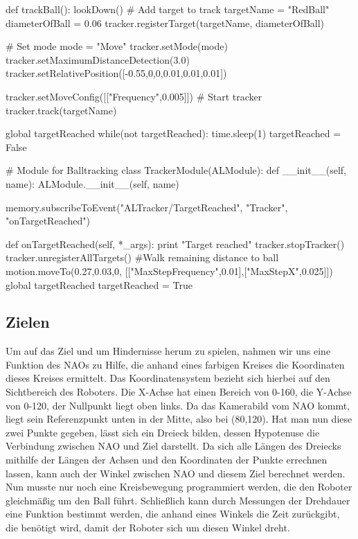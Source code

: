 \documentclass{scrartcl}
\begin{document}
\begin{python}
def trackBall():
    lookDown()
    # Add target to track
    targetName = "RedBall"
    diameterOfBall = 0.06
    tracker.registerTarget(targetName, diameterOfBall)

    # Set mode
    mode = "Move"
    tracker.setMode(mode)
    tracker.setMaximumDistanceDetection(3.0)
    tracker.setRelativePosition([-0.55,0,0,0.01,0.01,0.01])

    tracker.setMoveConfig([["Frequency",0.005]])
    # Start tracker
    tracker.track(targetName)

    global targetReached
    while(not targetReached):
        time.sleep(1)
    targetReached = False
    
# Module for Balltracking
class TrackerModule(ALModule):
    def __init__(self, name):
        ALModule.__init__(self, name)

        memory.subscribeToEvent("ALTracker/TargetReached",
            "Tracker",
            "onTargetReached")

    def onTargetReached(self, *_args):
        print "Target reached"
        tracker.stopTracker()
        tracker.unregisterAllTargets()
        #Walk remaining distance to ball
        motion.moveTo(0.27,0.03,0,
            [["MaxStepFrequency",0.01],["MaxStepX",0.025]])
        global targetReached
        targetReached = True
    
\end{python}

\subsection{Zielen}

Um auf das Ziel und um Hindernisse herum zu spielen, nahmen wir uns eine Funktion des NAOs zu Hilfe, die anhand eines farbigen Kreises die Koordinaten dieses Kreises ermittelt. Das Koordinatensystem bezieht sich hierbei auf den Sichtbereich des Roboters. Die X-Achse  
hat einen Bereich von 0-160, die Y-Achse von 0-120, der Nullpunkt liegt oben links. Da das Kamerabild vom NAO kommt, liegt sein Referenzpunkt unten in der Mitte, also bei (80,120). Hat man nun diese zwei Punkte gegeben, lässt sich ein Dreieck bilden, dessen Hypotenuse die Verbindung zwischen NAO und Ziel darstellt. Da sich alle Längen des Dreiecks mithilfe der Längen der Achsen und den Koordinaten der Punkte errechnen lassen, kann auch der Winkel zwischen NAO und diesem Ziel berechnet werden. Nun musste nur noch eine Kreisbewegung programmiert werden, die den Roboter gleichmäßig um den Ball führt. Schließlich kann durch Messungen der Drehdauer eine Funktion bestimmt werden, die anhand eines Winkels die Zeit zurückgibt, die benötigt wird, damit der Roboter sich um diesen Winkel dreht.\\
\end{document}

